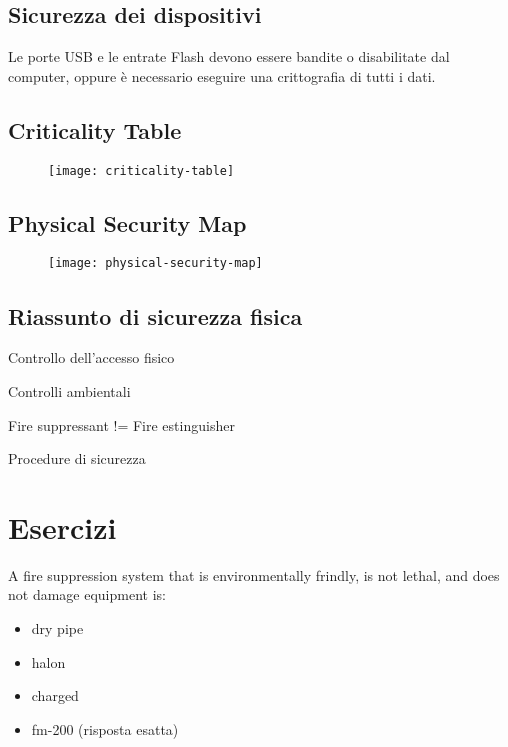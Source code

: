 \subsection{Sicurezza dei dispositivi}

Le porte USB e le entrate Flash devono essere bandite o disabilitate dal 
computer, oppure è necessario eseguire una crittografia di tutti i dati.


\subsection{Criticality Table}

\begin{figure}[H]
 \centering
 \texttt{[image: criticality-table]}
\end{figure}

\subsection{Physical Security Map}
\begin{figure}[H]
 \centering
 \texttt{[image: physical-security-map]}
\end{figure}

\subsection{Riassunto di sicurezza fisica}

Controllo dell'accesso fisico

Controlli ambientali

Fire suppressant != Fire estinguisher

Procedure di sicurezza

\section{Esercizi}








A fire suppression system that is environmentally frindly, is not lethal, and 
does not damage equipment is:
\begin{itemize}
\item dry pipe
\item halon
\item charged
\item fm-200 (risposta esatta)
\end{itemize}

